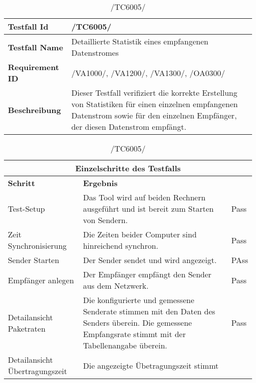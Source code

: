     \begin{table}[h]
        \caption{/TC6005/}
        \label{tab:TC6005}
        \begin{center}
            \begin{tabular}{|p{3.5cm}|p{12cm}|}
                \hline
                    \textbf{Testfall Id} & /TC6005/\\
                \hline
                    \textbf{Testfall Name} & Detaillierte Statistik eines
                    empfangenen Datenstromes\\
                \hline
                    \textbf{Requirement ID} & /VA1000/, /VA1200/, /VA1300/,
                    /OA0300/\\
                \hline
                    \textbf{Beschreibung} & Dieser Testfall verifiziert die
                    korrekte Erstellung von Statistiken für einen einzelnen
                    empfangenen Datenstrom sowie für den einzelnen Empfänger,
                    der diesen Datenstrom empfängt.\\
                \hline
            \end{tabular}
            \begin{tabular}{|p{2.5cm}|p{5cm}|p{7.55cm}|}
                \multicolumn{3}{|c|}{\textbf{Einzelschritte des Testfalls}} \\
                \hline
                    \textbf{Schritt} & \textbf{Ergebnis}\\
                \hline
                    Test-Setup & Das Tool wird auf beiden Rechnern
                    ausgeführt und ist bereit zum Starten von Sendern. & Pass\\
                \hline
                    Zeit Synchronisierung & Die Zeiten
                    beider Computer sind hinreichend synchron. & Pass\\
                \hline
                    Sender Starten & Der Sender sendet und wird
                    angezeigt. & PAss\\
                \hline
                    Empfänger anlegen & Der Empfänger empfängt den Sender aus
                    dem Netzwerk. & Pass\\
                \hline
                    Detailansicht Paketraten & Die konfigurierte und gemessene Senderate
                    stimmen mit den Daten des Senders überein. Die gemessene
                    Empfangsrate stimmt mit der Tabellenangabe überein. & Pass\\
                \hline
                    Detailansicht Übertragungszeit & Die angezeigte Übetragungszeit stimmt

\end{tabular}
\end{center}
\end{table}
